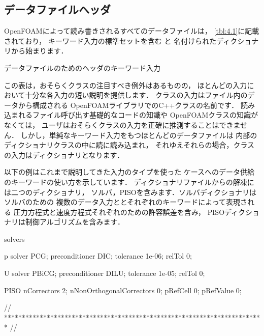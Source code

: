 \subsection{データファイルヘッダ}
\label{ssec:4.2.3}
OpenFOAMによって読み書きされるすべてのデータファイルは，
\autoref{tbl:4.1}に記載されており，
キーワード入力の標準セットを含む
%
%
と
名付けられたディクショナリから始まります．


\begin{table}[ht]
 
 \caption{データファイルのためのヘッダのキーワード入力}
 \label{tbl:4.1}
\end{table}


この表は，おそらくクラスの注目すべき例外はあるものの，
ほとんどの入力において十分な各入力の短い説明を提供します．
クラスの入力はファイル内のデータから構成される
OpenFOAMライブラリでのC++クラスの名前です．
読み込まれるファイル呼び出す基礎的なコードの知識や
OpenFOAMクラスの知識がなくては，
ユーザはおそらくクラスの入力を正確に推測することはできません．
しかし，単純なキーワード入力をもつほとんどのデータファイルは
内部のディクショナリクラスの中に読に読み込まれ，
それゆえそれらの場合，クラスの入力はディクショナリとなります．

以下の例はこれまで説明してきた入力のタイプを使った
ケースへのデータ供給のキーワードの使い方を示しています．
ディクショナリファイルからの解凍には二つのディクショナリ，
ソルバ，PISOを含みます．ソルバディクショナリはソルバのための
複数のデータ入力ととそれぞれのキーワードによって表現される
圧力方程式と速度方程式それぞれのための許容誤差を含み，
PISOディクショナリは制御アルゴリズムを含みます．
\begin{OFverbatim}[file, linenum=17]

solvers
{
    p
    {
        solver           PCG;
        preconditioner   DIC;
        tolerance        1e-06;
        relTol           0;
    }

    U
    {
        solver           PBiCG;
        preconditioner   DILU;
        tolerance        1e-05;
        relTol           0;
    }
}

PISO
{
    nCorrectors     2;
    nNonOrthogonalCorrectors 0;
    pRefCell        0;
    pRefValue       0;
}


// ************************************************************************* //
\end{OFverbatim}


